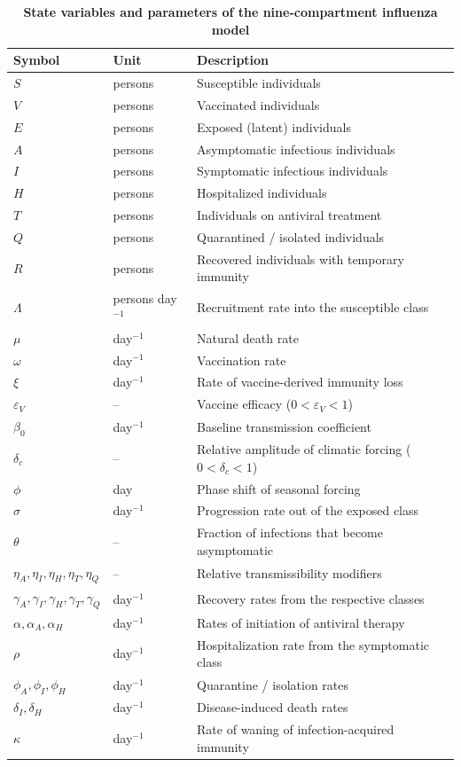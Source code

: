 \documentclass[12pt,a4paper]{article}
\theoremstyle{definition}
\theoremstyle{remark}
\begin{document}
\clearpage
\begin{table}[!ht]
\centering
\caption{\textbf{State variables and parameters of the nine-compartment influenza model}}
\label{tab:flu_params}
\begin{tabular}{@{}llp{7.2cm}@{}}
\toprule
\textbf{Symbol} & \textbf{Unit} & \textbf{Description} \\
\midrule
$S$ & persons & Susceptible individuals \\
$V$ & persons & Vaccinated individuals \\
$E$ & persons & Exposed (latent) individuals \\
$A$ & persons & Asymptomatic infectious individuals \\
$I$ & persons & Symptomatic infectious individuals \\
$H$ & persons & Hospitalized individuals \\
$T$ & persons & Individuals on antiviral treatment \\
$Q$ & persons & Quarantined / isolated individuals \\
$R$ & persons & Recovered individuals with temporary immunity \\
$\Lambda$ & persons day$^{-1}$ & Recruitment rate into the susceptible class \\
$\mu$ & day$^{-1}$ & Natural death rate \\
$\omega$ & day$^{-1}$ & Vaccination rate \\
$\xi$ & day$^{-1}$ & Rate of vaccine-derived immunity loss \\
$\varepsilon_V$ & -- & Vaccine efficacy ($0<\varepsilon_V<1$) \\
$\beta_0$ & day$^{-1}$ & Baseline transmission coefficient \\
$\delta_c$ & -- & Relative amplitude of climatic forcing ($0<\delta_c<1$) \\
$\phi$ & day & Phase shift of seasonal forcing \\
$\sigma$ & day$^{-1}$ & Progression rate out of the exposed class \\
$\theta$ & -- & Fraction of infections that become asymptomatic \\
$\eta_A,\eta_I,\eta_H,\eta_T,\eta_Q$ & -- & Relative transmissibility modifiers \\
$\gamma_A,\gamma_I,\gamma_H,\gamma_T,\gamma_Q$ & day$^{-1}$ & Recovery rates from the respective classes \\
$\alpha,\alpha_A,\alpha_H$ & day$^{-1}$ & Rates of initiation of antiviral therapy \\
$\rho$ & day$^{-1}$ & Hospitalization rate from the symptomatic class \\
$\phi_A,\phi_I,\phi_H$ & day$^{-1}$ & Quarantine / isolation rates \\
$\delta_I,\delta_H$ & day$^{-1}$ & Disease-induced death rates \\
$\kappa$ & day$^{-1}$ & Rate of waning of infection-acquired immunity \\
\bottomrule
\end{tabular}
\end{table}
\end{document}
